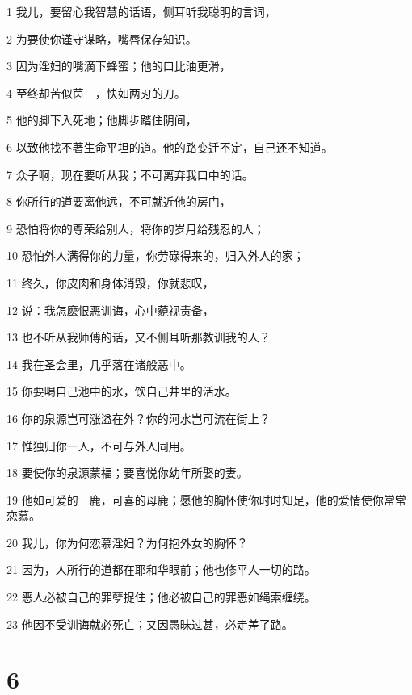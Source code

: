 \par 1 我儿，要留心我智慧的话语，侧耳听我聪明的言词，
\par 2 为要使你谨守谋略，嘴唇保存知识。
\par 3 因为淫妇的嘴滴下蜂蜜；他的口比油更滑，
\par 4 至终却苦似茵　，快如两刃的刀。
\par 5 他的脚下入死地；他脚步踏住阴间，
\par 6 以致他找不著生命平坦的道。他的路变迁不定，自己还不知道。
\par 7 众子啊，现在要听从我；不可离弃我口中的话。
\par 8 你所行的道要离他远，不可就近他的房门，
\par 9 恐怕将你的尊荣给别人，将你的岁月给残忍的人；
\par 10 恐怕外人满得你的力量，你劳碌得来的，归入外人的家；
\par 11 终久，你皮肉和身体消毁，你就悲叹，
\par 12 说：我怎麽恨恶训诲，心中藐视责备，
\par 13 也不听从我师傅的话，又不侧耳听那教训我的人？
\par 14 我在圣会里，几乎落在诸般恶中。
\par 15 你要喝自己池中的水，饮自己井里的活水。
\par 16 你的泉源岂可涨溢在外？你的河水岂可流在街上？
\par 17 惟独归你一人，不可与外人同用。
\par 18 要使你的泉源蒙福；要喜悦你幼年所娶的妻。
\par 19 他如可爱的　鹿，可喜的母鹿；愿他的胸怀使你时时知足，他的爱情使你常常恋慕。
\par 20 我儿，你为何恋慕淫妇？为何抱外女的胸怀？
\par 21 因为，人所行的道都在耶和华眼前；他也修平人一切的路。
\par 22 恶人必被自己的罪孽捉住；他必被自己的罪恶如绳索缠绕。
\par 23 他因不受训诲就必死亡；又因愚昧过甚，必走差了路。

\chapter{6}

